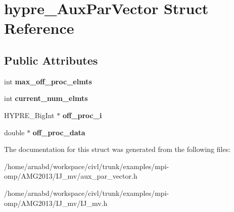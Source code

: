 \hypertarget{structhypre__AuxParVector}{}\section{hypre\+\_\+\+Aux\+Par\+Vector Struct Reference}
\label{structhypre__AuxParVector}
\subsection*{Public Attributes}
\begin{DoxyCompactItemize}
\item 
\hypertarget{structhypre__AuxParVector_a6c760588f927167bf3b815f2f14a105e}{}int {\bfseries max\+\_\+off\+\_\+proc\+\_\+elmts}\label{structhypre__AuxParVector_a6c760588f927167bf3b815f2f14a105e}

\item 
\hypertarget{structhypre__AuxParVector_ae5eae15abca5d8b1491a75c341b31fe2}{}int {\bfseries current\+\_\+num\+\_\+elmts}\label{structhypre__AuxParVector_ae5eae15abca5d8b1491a75c341b31fe2}

\item 
\hypertarget{structhypre__AuxParVector_aa532a7769f7c0cd35ed526db1738b9c6}{}H\+Y\+P\+R\+E\+\_\+\+Big\+Int $\ast$ {\bfseries off\+\_\+proc\+\_\+i}\label{structhypre__AuxParVector_aa532a7769f7c0cd35ed526db1738b9c6}

\item 
\hypertarget{structhypre__AuxParVector_a44aa8dc436f5fbbe775f3a27dfde30c4}{}double $\ast$ {\bfseries off\+\_\+proc\+\_\+data}\label{structhypre__AuxParVector_a44aa8dc436f5fbbe775f3a27dfde30c4}

\end{DoxyCompactItemize}


The documentation for this struct was generated from the following files\+:\begin{DoxyCompactItemize}
\item 
/home/arnabd/workspace/civl/trunk/examples/mpi-\/omp/\+A\+M\+G2013/\+I\+J\+\_\+mv/aux\+\_\+par\+\_\+vector.\+h\item 
/home/arnabd/workspace/civl/trunk/examples/mpi-\/omp/\+A\+M\+G2013/\+I\+J\+\_\+mv/I\+J\+\_\+mv.\+h\end{DoxyCompactItemize}
